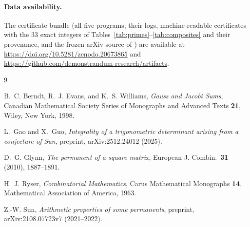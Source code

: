 \documentclass[10pt]{article}
\theoremstyle{remark}
\begin{document}
\paragraph{Data availability.}
The certificate bundle (all five programs, their logs, machine-readable
certificates with the 33 exact integers of
Tables~\ref{tab:primes}--\ref{tab:composites} and their provenance, and
the frozen arXiv source of \cite{Sun2021}) are available at
\url{https://doi.org/10.5281/zenodo.20673865} and
\url{https://github.com/demonstrandum-research/artifacts}.

\begin{thebibliography}{9}\small\setlength{\itemsep}{1pt}

B.~C. Berndt, R.~J. Evans, and K.~S. Williams,
\emph{Gauss and Jacobi Sums},
Canadian Mathematical Society Series of Monographs and Advanced Texts
\textbf{21}, Wiley, New York, 1998.

L.~Gao and X.~Guo,
\emph{Integrality of a trigonometric determinant arising from a conjecture
of Sun},
preprint, arXiv:2512.24012 (2025).

D.~G. Glynn,
\emph{The permanent of a square matrix},
European J. Combin.\ \textbf{31} (2010), 1887--1891.

H.~J. Ryser,
\emph{Combinatorial Mathematics},
Carus Mathematical Monographs \textbf{14},
Mathematical Association of America, 1963.

Z.-W. Sun,
\emph{Arithmetic properties of some permanents},
preprint, arXiv:2108.07723v7 (2021--2022).

\end{thebibliography}
\end{document}
